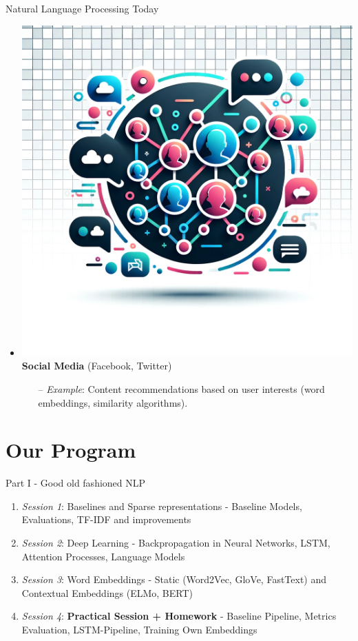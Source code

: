 \documentclass{beamer}
\newenvironment{stepitemize}{\begin{itemize}[<+->]}{\end{itemize} }
\begin{document}
\begin{frame}{Natural Language Processing Today}
\begin{stepitemize}
\begin{itemize}
\item[--] \textit{Example}: Classifying emails as spam or not (supervised learning).
\end{itemize}
\item \includegraphics[scale=0.015]{figures/social_media_icon.png} \textbf{Social Media} (Facebook, Twitter)
\begin{itemize}
\item[--] \textit{Example}: Content recommendations based on user interests (word embeddings, similarity algorithms).
\end{itemize}
\end{stepitemize}

\end{frame}

\section{Our Program}

\begin{frame}{Part I - Good old fashioned NLP}

\begin{enumerate}
  \item \textit{Session 1}: Baselines and Sparse representations - Baseline Models, Evaluations, TF-IDF and improvements
  \item \textit{Session 2}: Deep Learning - Backpropagation in Neural Networks, LSTM, Attention Processes, Language Models
  \item \textit{Session 3}: Word Embeddings - Static (Word2Vec, GloVe, FastText) and Contextual Embeddings (ELMo, BERT)
  \item \textit{Session 4}: \textbf{Practical Session + Homework} - Baseline Pipeline, Metrics Evaluation, LSTM-Pipeline, Training Own Embeddings
\end{enumerate}

\end{frame}
\end{document}
